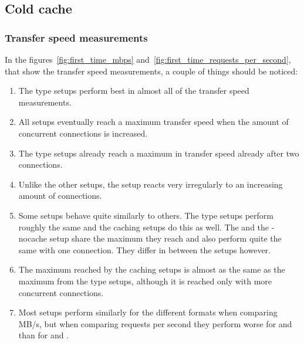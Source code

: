 \documentclass[twoside,openright]{uva-bachelor-thesis}
\begin{document}
\subsection{Cold cache}

\subsubsection{Transfer speed measurements}
In the figures~\ref{fig:first_time_mbps}
and~\ref{fig:first_time_requests_per_second}, that show the transfer speed
measurements, a couple of things should be noticed:
\begin{enumerate}
    \item
        The \cdn type setups perform best in almost all of the transfer
        speed measurements.

    \item
        All setups eventually reach a maximum transfer speed when the amount of
        concurrent connections is increased.

    \item
        The \cdn type setups already reach a maximum in transfer speed already
        after two connections.

    \item
        Unlike the other setups, the \ipp setup reacts very irregularly to
        an increasing amount of connections.

    \item
        Some setups behave quite similarly to others. The \cdn type setups perform
        roughly the same and the caching \lt setups do this as well. The \ipp
        and the \lt-nocache setup share the maximum they reach and also perform
        quite the same with one connection. They differ in between the setups
        however.

    \item
        The maximum reached by the caching \lt setups is almost as the same as
        the maximum from the \cdn type setups, although it is reached only with
        more concurrent connections.

    \item
        Most setups perform similarly for the different formats when comparing
        MB/s, but when comparing requests per second they perform worse for \hds
        and \hls than for \dash and \iss.

\end{enumerate}



\FloatBarrier
\end{document}
